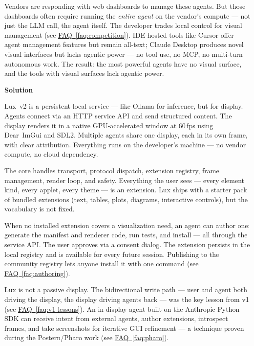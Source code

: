 \documentclass[11pt,letterpaper]{article}
\newcommand{\prsection}[1]{%
  \vspace{1em}%
  {\large\bfseries\color{SectionBlue}#1}%
  \vspace{0.3em}\par%
}
\newcommand{\faqref}[1]{\hyperref[#1]{FAQ~\ref*{#1}}}
\begin{document}
Vendors are responding with web dashboards to manage these agents.  But those
dashboards often require running the \emph{entire agent} on the vendor's
compute --- not just the LLM call, the agent itself.  The developer trades
local control for visual management (see \faqref{faq:competition}).
IDE-hosted tools like Cursor offer agent management features but remain
all-text; Claude Desktop produces novel visual interfaces but lacks agentic
power --- no tool use, no MCP, no multi-turn autonomous work.  The result:
the most powerful agents have no visual surface, and the tools with visual
surfaces lack agentic power.

\prsection{Solution}

Lux~v2 is a persistent local service --- like Ollama\cite{ollama2025} for
inference, but for display.  Agents connect via an HTTP service API and send
structured content.  The display renders it in a native GPU-accelerated
window at 60\,fps using Dear~ImGui\cite{imgui2025} and SDL2.  Multiple
agents share one display, each in its own frame, with clear attribution.
Everything runs on the developer's machine --- no vendor compute, no cloud
dependency.

The core handles transport, protocol dispatch, extension registry, frame
management, render loop, and safety.  Everything the user sees ---
every element kind, every applet, every theme --- is an extension.  Lux ships
with a starter pack of bundled extensions (text, tables, plots, diagrams,
interactive controls), but the vocabulary is not fixed.

When no installed extension covers a visualization need, an agent can author
one: generate the manifest and renderer code, run tests, and install ---
all through the service API.  The user approves via a consent dialog.
The extension persists in the local registry and is available for every
future session.  Publishing to the community registry lets anyone install it
with one command (see \faqref{faq:authoring}).

Lux is not a passive display.  The bidirectional write path --- user and
agent both driving the display, the display driving agents back --- was the
key lesson from v1 (see \faqref{faq:v1-lessons}).  An in-display agent
built on the Anthropic Python SDK can receive intent from external agents,
author extensions, introspect frames, and take screenshots for iterative GUI
refinement --- a technique proven during the Postern/Pharo
work\cite{postern2026,claudeagentsdk2026} (see \faqref{faq:pharo}).
\end{document}
